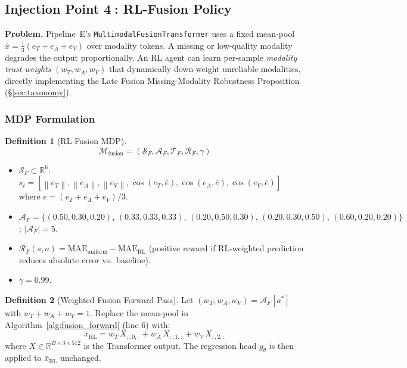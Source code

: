 \documentclass[12pt,a4paper]{article}
\theoremstyle{definition}
\newtheorem{definition}{Definition}[section]
\theoremstyle{plain}
\theoremstyle{remark}
\newcommand{\R}{\mathbb{R}}
\newcommand{\Norm}[1]{\left\|#1\right\|}
\begin{document}
\subsection{Injection Point \textcircled{4}: RL-Fusion Policy}
\label{sec:rl_fusion}

\begin{tcolorbox}[rlinjbox,title={Injection \textcircled{4} --- RL-Fusion}]
\textbf{Problem.}
Pipeline~E's \texttt{MultimodalFusionTransformer} uses a fixed mean-pool
$\bar{x} = \frac{1}{3}(e_T + e_A + e_V)$ over modality tokens.
A missing or low-quality modality degrades the output proportionally.
An RL agent can learn per-sample \emph{modality trust weights}
$(w_T, w_A, w_V)$ that dynamically down-weight unreliable modalities, directly
implementing the Late Fusion Missing-Modality Robustness Proposition
(\S\ref{sec:taxonomy}).
\end{tcolorbox}

\subsubsection{MDP Formulation}

\begin{definition}[RL-Fusion MDP]
\label{def:rl_fusion_mdp}
\[
  \mathcal{M}_{\text{fusion}} = (\mathcal{S}_F,\mathcal{A}_F,\mathcal{T}_F,\mathcal{R}_F,\gamma)
\]
\begin{itemize}[nosep]
  \item $\mathcal{S}_F \subset \R^6$:
        $s_t = [\Norm{e_T},\Norm{e_A},\Norm{e_V},
        \cos(e_T,\bar{e}),\cos(e_A,\bar{e}),\cos(e_V,\bar{e})]$
        where $\bar{e} = (e_T+e_A+e_V)/3$.
  \item $\mathcal{A}_F = \{(0.50,0.30,0.20),\,(0.33,0.33,0.33),\,
        (0.20,0.50,0.30),\,(0.20,0.30,0.50),\,(0.60,0.20,0.20)\}$;
        $|\mathcal{A}_F|=5$.
  \item $\mathcal{R}_F(s,a) = \text{MAE}_{\text{uniform}} - \text{MAE}_{\text{RL}}$
        (positive reward if RL-weighted prediction reduces absolute error vs.\ baseline).
  \item $\gamma = 0.99$.
\end{itemize}
\end{definition}

\begin{definition}[Weighted Fusion Forward Pass]
\label{def:weighted_fusion}
Let $(w_T, w_A, w_V) = \mathcal{A}_F[a^*]$ with $w_T + w_A + w_V = 1$.
Replace the mean-pool in Algorithm~\ref{alg:fusion_forward} (line 6) with:
\[
  \bar{x}_{\text{RL}} = w_T\,X_{:,0,:} + w_A\,X_{:,1,:} + w_V\,X_{:,2,:}
\]
where $X \in \R^{B \times 3 \times 512}$ is the Transformer output.
The regression head $g_\theta$ is then applied to $\bar{x}_{\text{RL}}$ unchanged.
\end{definition}
\end{document}
